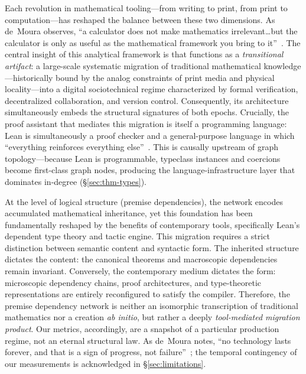 Each revolution in mathematical tooling---from writing to print, from print to computation---has reshaped the balance between these two dimensions. As de~Moura observes, ``a calculator does not make mathematics irrelevant\ldots but the calculator is only as useful as the mathematical framework you bring to it''~\cite{demoura2026proofassistants}. The central insight of this analytical framework is that  functions as a \emph{transitional artifact}: a large-scale systematic migration of traditional mathematical knowledge---historically bound by the analog constraints of print media and physical locality---into a digital sociotechnical regime characterized by formal verification, decentralized collaboration, and version control. Consequently, its architecture simultaneously embeds the structural signatures of both epochs. Crucially, the proof assistant that mediates this migration is itself a programming language: Lean is simultaneously a proof checker and a general-purpose language in which ``everything reinforces everything else''~\cite{demoura2026proofassistants}. This is causally upstream of graph topology---because Lean is programmable, typeclass instances and coercions become first-class graph nodes, producing the language-infrastructure layer that dominates in-degree (\S\ref{sec:thm-types}).

At the level of logical structure (premise dependencies), the network encodes accumulated mathematical inheritance, yet this foundation has been fundamentally reshaped by the benefits of contemporary tools, specifically Lean's dependent type theory and tactic engine. This migration requires a strict distinction between semantic content and syntactic form. The inherited structure dictates the content: the canonical theorems and macroscopic dependencies remain invariant. Conversely, the contemporary medium dictates the form: microscopic dependency chains, proof architectures, and type-theoretic representations are entirely reconfigured to satisfy the compiler. Therefore, the premise dependency network is neither an isomorphic transcription of traditional mathematics nor a creation \textit{ab initio}, but rather a deeply \emph{tool-mediated migration product}. Our metrics, accordingly, are a snapshot of a particular production regime, not an eternal structural law. As de~Moura notes, ``no technology lasts forever, and that is a sign of progress, not failure''~\cite{demoura2026proofassistants}; the temporal contingency of our measurements is acknowledged in \S\ref{sec:limitations}.

